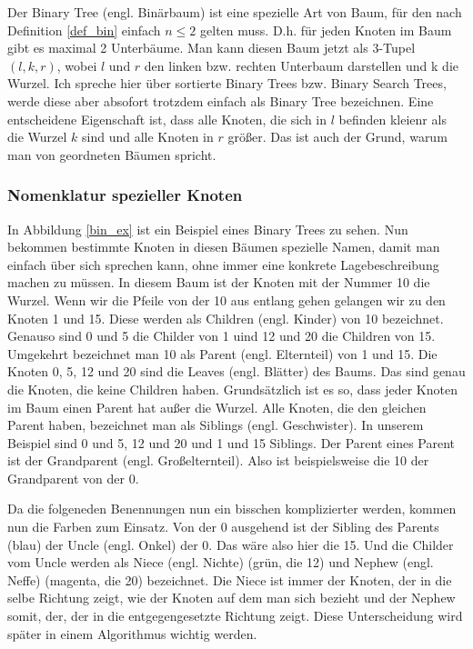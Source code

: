\documentclass[11pt]{article}
\begin{document}
Der Binary Tree (engl. Binärbaum) ist eine spezielle Art von Baum, für den nach Definition \ref{def_bin} einfach $n \leq 2$ gelten muss. D.h. für jeden Knoten im Baum gibt es maximal 2 Unterbäume.
Man kann diesen Baum jetzt als 3-Tupel $(l, k, r)$, wobei $l$ und $r$ den linken bzw. rechten Unterbaum darstellen und k die Wurzel. Ich spreche hier über sortierte Binary Trees bzw. Binary Search Trees, werde diese aber absofort trotzdem einfach als Binary Tree bezeichnen.
Eine entscheidene Eigenschaft ist, dass alle Knoten, die sich in $l$ befinden kleienr als die Wurzel $k$ sind und alle Knoten in $r$ größer.
Das ist auch der Grund, warum man von geordneten Bäumen spricht. \cite[S. 147]{aad}

\subsubsection{Nomenklatur spezieller Knoten}

In Abbildung \ref{bin_ex} ist ein Beispiel eines Binary Trees zu sehen. Nun bekommen bestimmte Knoten in diesen Bäumen spezielle Namen, damit man einfach über sich sprechen kann, ohne immer
eine konkrete Lagebeschreibung machen zu müssen. In diesem Baum ist der Knoten mit der Nummer 10 die Wurzel.
Wenn wir die Pfeile von der 10 aus entlang gehen gelangen wir zu den Knoten 1 und 15. Diese werden als Children (engl. Kinder) von 10 bezeichnet. Genauso sind 0 und 5 die Childer von 1 uind 12 und 20 die Children von 15.
Umgekehrt bezeichnet man 10 als Parent (engl. Elternteil) von 1 und 15. 
Die Knoten 0, 5, 12 und 20 sind die Leaves (engl. Blätter) des Baums. Das sind genau die Knoten, die keine Children haben.
Grundsätzlich ist es so, dass jeder Knoten im Baum einen Parent hat außer die Wurzel.
Alle Knoten, die den gleichen Parent haben, bezeichnet man als Siblings (engl. Geschwister). In unserem Beispiel sind 0 und 5, 12 und 20 und 1 und 15 Siblings. 
Der Parent eines Parent ist der Grandparent (engl. Großelternteil). Also ist beispielsweise die 10 der Grandparent von der 0.
\cite[S.311]{aop}

Da die folgeneden Benennungen nun ein bisschen komplizierter werden, kommen nun die Farben zum Einsatz. Von der 0 ausgehend ist der Sibling des Parents (blau) der Uncle (engl. Onkel) der 0. Das wäre also hier die 15.
Und die Childer vom Uncle werden als Niece (engl. Nichte) (grün, die 12) und Nephew (engl. Neffe) (magenta, die 20) bezeichnet. Die Niece ist immer der Knoten, der in die selbe Richtung zeigt, wie der Knoten auf dem man sich bezieht und der Nephew somit, der, der in die entgegengesetzte Richtung zeigt.
Diese Unterscheidung wird später in einem Algorithmus wichtig werden.
\end{document}
